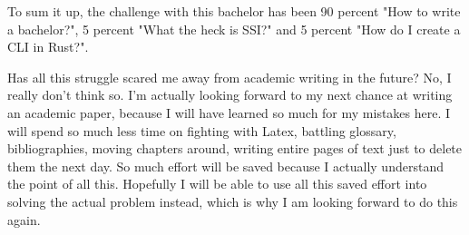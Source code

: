 To sum it up, the challenge with this bachelor has been 90 percent "How to write a bachelor?", 5 percent "What the heck is SSI?" and 5 percent "How do I create a CLI in Rust?".

Has all this struggle scared me away from academic writing in the future? No, I really don't think so. I'm actually looking forward to my next chance at writing an academic paper, because I will have learned so much for my mistakes here. I will spend so much less time on fighting with Latex, battling glossary, bibliographies, moving chapters around, writing entire pages of text just to delete them the next day. So much effort will be saved because I actually understand the point of all this. Hopefully I will be able to use all this saved effort into solving the actual problem instead, which is why I am looking forward to do this again.
